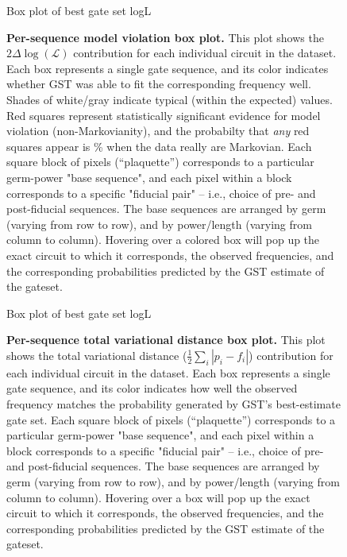 \documentclass{article}[11pt]
\newcommand{\putfield}[2]{#2}
\begin{document}
{{\begin{figure}
  \begin{center}
    \begin{adjustbox}{max width=\textwidth}
      \putfield{bestEstimateColorBoxPlot}{Box plot of best gate set logL}
    \end{adjustbox}
    \caption{\textbf{Per-sequence model violation box plot.}  This plot shows the $2\Delta\log(\mathcal{L})$ contribution for each individual circuit in the dataset.  Each box represents a single gate sequence, and its color indicates whether GST was able to fit the corresponding frequency well.  Shades of white/gray indicate typical (within the expected) values. Red squares represent statistically significant evidence for model violation (non-Markovianity), and the probabilty that \emph{any} red squares appear is \putfield{linlg_pcntle}{}\% when the data really are Markovian. Each square block of pixels (``plaquette'') corresponds to a particular germ-power "base sequence", and each pixel within a block corresponds to a specific "fiducial pair" -- i.e., choice of pre- and post-fiducial sequences.  The base sequences are arranged by germ (varying from row to row), and by power/length (varying from column to column).  Hovering over a colored box will pop up the exact circuit to which it corresponds, the observed frequencies, and the corresponding probabilities predicted by the GST estimate of the gateset.\label{bestEstimateColorBoxPlot}}
\end{center}
\end{figure}

\begin{figure}
  \begin{center}
    \begin{adjustbox}{max width=\textwidth}
      \putfield{bestEstimateColorBoxPlot}{Box plot of best gate set logL}
    \end{adjustbox}
    \caption{\textbf{Per-sequence total variational distance box plot.}  This plot shows the total variational distance ($\frac{1}{2}\sum_i|p_i-f_i|$) contribution for each individual circuit in the dataset.  Each box represents a single gate sequence, and its color indicates how well the observed frequency matches the probability generated by GST's best-estimate gate set.  Each square block of pixels (``plaquette'') corresponds to a particular germ-power "base sequence", and each pixel within a block corresponds to a specific "fiducial pair" -- i.e., choice of pre- and post-fiducial sequences.  The base sequences are arranged by germ (varying from row to row), and by power/length (varying from column to column).  Hovering over a box will pop up the exact circuit to which it corresponds, the observed frequencies, and the corresponding probabilities predicted by the GST estimate of the gateset.\label{bestEstimateTVDColorBoxPlot}}
\end{center}
\end{figure}


}}
\end{document}
